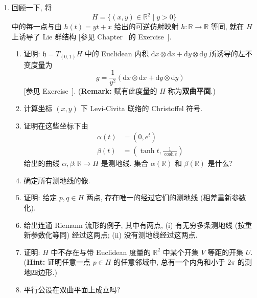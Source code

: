 \begin{enumerate}[label=(\arabic*),ref=\arabic*,leftmargin=*]
\item\label{ex:hyperbolic-plane}
回顾一下, 将
\[
  H=\{(x,y)\in\mathbb{R}^2\mid y>0\}
\]
中的每一点与由 $h(t)=yt+x$ 给出的可逆仿射映射 $h:\mathbb{R}\to\mathbb{R}$ 等同, 就在 $H$ 上诱导了 Lie 群结构 [参见 Chapter~ 的 Exercise~].
\begin{enumerate}[label=(\alph*),leftmargin=*]
\item 证明: $\mathfrak h=T_{(0,1)}H$ 中的 Euclidean 内积 $\mathrm{d}x\otimes\mathrm{d}x+\mathrm{d}y\otimes\mathrm{d}y$ 所诱导的左不变度量为
\[
  g=\frac{1}{y^2}(\mathrm{d}x\otimes\mathrm{d}x+\mathrm{d}y\otimes\mathrm{d}y)
\]
[参见 Exercise~]. {\small (\textbf{Remark:} 赋有此度量的 $H$ 称为\textbf{双曲平面}.)}
\item 计算坐标 $(x,y)$ 下 Levi-Civita 联络的 Christoffel 符号.
\item 证明在这些坐标下由
\begin{align*}
  \alpha(t)&=(0,e^t)\\
  \beta(t)&=\left(\tanh t,\frac{1}{\cosh t}\right)
\end{align*}
给出的曲线 $\alpha,\beta:\mathbb{R}\to H$ 是测地线. 集合 $\alpha(\mathbb{R})$ 和 $\beta(\mathbb{R})$ 是什么?
\item 确定所有测地线的像.
\item 证明: 给定 $p,q\in H$ 两点, 存在唯一的经过它们的测地线 (相差重新参数化).
\item 给出连通 Riemann 流形的例子, 其中有两点, (i) 有无穷多条测地线 (按重新参数化等同) 经过这两点; (ii) 没有测地线经过这两点.
\item 证明: $H$ 中不存在与带 Euclidean 度量的 $\mathbb{R}^2$ 中某个开集 $V$ 等距的开集 $U$. {\small (\textbf{Hint:} 证明任意一点 $p\in H$ 的任意邻域中, 总有一个内角和小于 $2\pi$ 的测地四边形.)}
\item 平行公设在双曲平面上成立吗?
\end{enumerate}


\end{enumerate}
